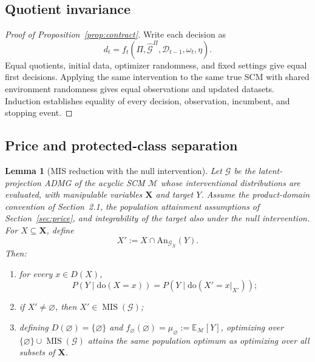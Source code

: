 \documentclass[twoside]{article}
\newtheorem{lemma}{Lemma}
\newcommand{\E}{\mathbb{E}}
\newcommand{\doo}{\mathrm{do}}
\newcommand{\An}{\mathrm{An}}
\newcommand{\Gg}{\mathcal{G}}
\begin{document}
\subsection{Quotient invariance}

\begin{proof}[Proof of Proposition~\ref{prop:contract}]
Write each decision as
\[
d_t=f_t\!\left(\Pi,\widehat{\Gg}^{\Pi},
\mathcal D_{t-1},\omega_t,\eta\right).
\]
Equal quotients, initial data, optimizer randomness, and fixed
settings give equal first decisions. Applying the same intervention
to the same true SCM with shared environment randomness gives
equal observations and updated datasets. Induction establishes
equality of every decision, observation, incumbent, and stopping
event.
\end{proof}

\subsection{Price and protected-class separation}

\begin{lemma}[MIS reduction with the null intervention]
\label{lem:mis-reduction}
Let \(\mathcal G\) be the latent-projection ADMG of the acyclic SCM \(\mathcal M\) whose interventional distributions are evaluated, with manipulable variables \(\mathbf X\) and target \(Y\). Assume the product-domain convention of Section~2.1, the population attainment assumptions of Section~\ref{sec:price}, and integrability of the target also under the null intervention. For \(X\subseteq\mathbf X\), define
\[
 X':=X\cap\An_{\mathcal G_{\bar X}}(Y).
\]
Then:
\begin{enumerate}[label=(\roman*)]
 \item for every \(x\in D(X)\),
 \[
  P(Y\mid\doo(X=x))
  =P\!\left(Y\mid\doo(X'=x|_{X'})\right);
 \]
\item if \(X'\ne\varnothing\), then \(X'\in\operatorname{MIS}(\mathcal G)\); \item defining \(D(\varnothing)=\{\varnothing\}\) and \(f_{\varnothing}(\varnothing)=\mu_{\varnothing}:=\E_{\mathcal M}[Y]\), optimizing over \(\{\varnothing\}\cup\operatorname{MIS}(\mathcal G)\) attains the same population optimum as optimizing over all subsets of \(\mathbf X\).
\end{enumerate}
\end{lemma}
\end{document}
